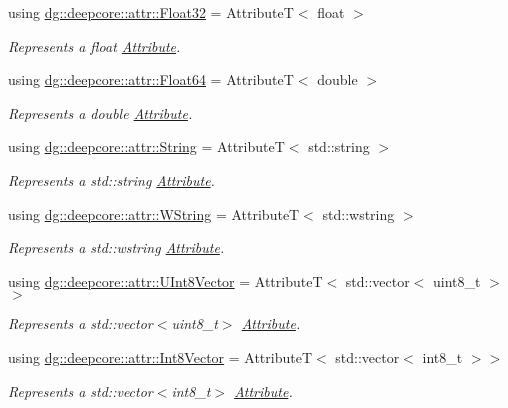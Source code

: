\begin{DoxyCompactItemize}
using \hyperlink{group___process_attributes_ga61b8924d2ea1e93844df63eab076eccc}{dg\+::deepcore\+::attr\+::\+Float32} = AttributeT$<$ float $>$
\begin{DoxyCompactList}\small\item\em Represents a {\ttfamily float} \hyperlink{classdg_1_1deepcore_1_1_attribute}{Attribute}. \end{DoxyCompactList}\item 
using \hyperlink{group___process_attributes_ga9d504bf1e2018cf5e97d3cca2a08aad9}{dg\+::deepcore\+::attr\+::\+Float64} = AttributeT$<$ double $>$
\begin{DoxyCompactList}\small\item\em Represents a {\ttfamily double} \hyperlink{classdg_1_1deepcore_1_1_attribute}{Attribute}. \end{DoxyCompactList}\item 
using \hyperlink{group___process_attributes_ga84ae1d49f195126fef6224ad5817201e}{dg\+::deepcore\+::attr\+::\+String} = AttributeT$<$ std\+::string $>$
\begin{DoxyCompactList}\small\item\em Represents a {\ttfamily std\+::string} \hyperlink{classdg_1_1deepcore_1_1_attribute}{Attribute}. \end{DoxyCompactList}\item 
using \hyperlink{group___process_attributes_gafbc911757b794babe4866ad9c709fa44}{dg\+::deepcore\+::attr\+::\+W\+String} = AttributeT$<$ std\+::wstring $>$
\begin{DoxyCompactList}\small\item\em Represents a {\ttfamily std\+::wstring} \hyperlink{classdg_1_1deepcore_1_1_attribute}{Attribute}. \end{DoxyCompactList}\item 
using \hyperlink{group___process_attributes_ga122a5889d6ae8010508171b0456ffaa0}{dg\+::deepcore\+::attr\+::\+U\+Int8\+Vector} = AttributeT$<$ std\+::vector$<$ uint8\+\_\+t $>$$>$
\begin{DoxyCompactList}\small\item\em Represents a {\ttfamily std\+::vector$<$uint8\+\_\+t$>$} \hyperlink{classdg_1_1deepcore_1_1_attribute}{Attribute}. \end{DoxyCompactList}\item 
using \hyperlink{group___process_attributes_gae5a53dc88f8ef5cc357df096aa806ca4}{dg\+::deepcore\+::attr\+::\+Int8\+Vector} = AttributeT$<$ std\+::vector$<$ int8\+\_\+t $>$$>$
\begin{DoxyCompactList}\small\item\em Represents a {\ttfamily std\+::vector$<$int8\+\_\+t$>$} \hyperlink{classdg_1_1deepcore_1_1_attribute}{Attribute}. \end{DoxyCompactList}\item 

\end{DoxyCompactItemize}
